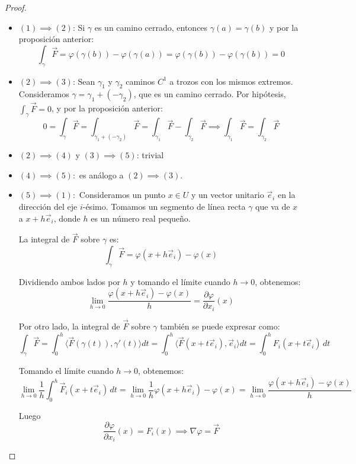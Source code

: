 \begin{proof}
    \leavevmode
    \begin{itemize}
        \item $(1) \implies (2)$: Si $\gamma$ es un camino cerrado, entonces $\gamma(a) = \gamma(b)$ y por la proposición anterior:
              \[
                  \int_{\gamma} \vec{F} = \varphi(\gamma(b)) - \varphi(\gamma(a)) = \varphi(\gamma(b)) - \varphi(\gamma(b)) = 0
              \]
        \item $(2) \implies (3)$: Sean $\gamma_1$ y $\gamma_2$ caminos $C^1$ a trozos con los mismos extremos. Consideramos $\gamma = \gamma_1 + (-\gamma_2)$, que es un camino cerrado. Por hipótesis, $\int_{\gamma} \vec{F} = 0$, y por la proposición anterior:
              \[
                  0 = \int_{\gamma} \vec{F} = \int_{\gamma_1 + (-\gamma_2)} \vec{F} = \int_{\gamma_1} \vec{F} - \int_{\gamma_2} \vec{F} \implies \int_{\gamma_1} \vec{F} = \int_{\gamma_2} \vec{F}
              \]
        \item $(2) \implies (4)$ y $(3) \implies (5)$: trivial
        \item $(4) \implies (5):$ es análogo a $(2) \implies (3)$.
        \item $(5) \implies (1):$ Consideramos un punto \(x \in U\) y un vector unitario \(\vec{e}_i\) en la dirección del eje \(i\)-ésimo. Tomamos un segmento de línea recta \(\gamma\) que va de \(x\) a \(x + h \vec{e}_i\), donde \(h\) es un número real pequeño.

              La integral de \(\vec{F}\) sobre \(\gamma\) es:
              \[
                  \int_{\gamma} \vec{F} = \varphi(x + h \vec{e}_i) - \varphi(x)
              \]

              Dividiendo ambos lados por \(h\) y tomando el límite cuando \(h \to 0\),
              obtenemos:
              \[
                  \lim_{h \to 0} \frac{\varphi(x + h \vec{e}_i) - \varphi(x)}{h} = \frac{\partial \varphi}{\partial x_i}(x)
              \]

              Por otro lado, la integral de \(\vec{F}\) sobre \(\gamma\) también se puede
              expresar como:
              \[
                  \int_{\gamma} \vec{F} = \int_{0}^{h} \langle \vec{F}(\gamma(t)), \gamma'(t) \rangle dt = \int_{0}^{h} \langle \vec{F}(x + t \vec{e}_i), \vec{e}_i \rangle dt = \int_{0}^{h} F_i(x + t \vec{e}_i) \, dt
                \]

              Tomando el límite cuando \(h \to 0\), obtenemos:
              \[
                  \lim_{h \to 0} \frac{1}{h} \int_{0}^{h} \vec{F}_i(x + t \vec{e}_i) \, dt = \lim_{h \to 0} \frac{1}{h} \varphi(x + h \vec{e}_i) - \varphi(x) = \lim_{h \to 0} \frac{\varphi(x + h \vec{e}_i) - \varphi(x)}{h}
                \]

              Luego
              \[
                  \frac{\partial \varphi}{\partial x_i}(x) = F_i(x) \implies \nabla \varphi = \vec{F}
              \]
    \end{itemize}
\end{proof}

